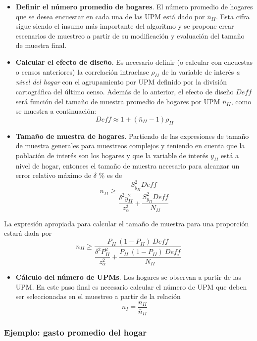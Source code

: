 \documentclass[
  10pt,
  spanish,
]{book}
\providecommand{\tightlist}{%
  \setlength{\itemsep}{0pt}\setlength{\parskip}{0pt}}
\begin{document}
\begin{itemize}
\item
  \textbf{Definir el número promedio de hogares}. El número promedio de hogares que se desea encuestar en cada una de las UPM está dado por \(\bar{n}_{II}\). Esta cifra sigue siendo el insumo más importante del algoritmo y se propone crear escenarios de muestreo a partir de su modificación y evaluación del tamaño de muestra final.
\item
  \textbf{Calcular el efecto de diseño}. Es necesario definir (o calcular con encuestas o censos anteriores) la correlación intraclase \(\rho_{II}\) de la variable de interés \emph{a nivel del hogar} con el agrupamiento por UPM definido por la división cartográfica del último censo. Además de lo anterior, el efecto de diseño \(Deff\) será función del tamaño de muestra promedio de hogares por UPM \(\bar{n}_{II}\), como se muestra a continuación:
  \[
  Deff \approx 1 + (\bar{n}_{II} - 1)\rho_{II}
  \]
\item
  \textbf{Tamaño de muestra de hogares}. Partiendo de las expresiones de tamaño de muestra generales para muestreos complejos y teniendo en cuenta que la población de interés son los hogares y que la variable de interés \(y_{II}\) está a nivel de hogar, entonces el tamaño de muestra necesario para alcanzar un error relativo máximo de \(\delta\) \% es de
  \[
  n_{II} \geq \dfrac{S^2_{y_{II}}Deff}{\dfrac{\delta^2 \bar{y}_{II}^2}{z_{\alpha}^2}+\dfrac{S^2_{y_{II}}Deff}{N_{II}}}
  \]
\end{itemize}

La expresión apropiada para calcular el tamaño de muestra para una proporción estará dada por
\[
n_{II} \geq \dfrac{P_{II}\ (1-P_{II})\ Deff}{\dfrac{\delta^2P^2_{II}}{z_{\alpha}^2 }+\dfrac{P_{II}\ (1-P_{II}) \ Deff}{N_{II}}}
\]

\begin{itemize}
\tightlist
\item
  \textbf{Cálculo del número de UPMs}. Los hogares se observan a partir de las UPM. En este paso final es necesario calcular el número de UPM que deben ser seleccionadas en el muestreo a partir de la relación
  \[
  n_{I} = \frac{n_{II}}{\bar{n}_{II}}
  \]
\end{itemize}

\hypertarget{ejemplo-gasto-promedio-del-hogar}{%
\subsubsection{Ejemplo: gasto promedio del hogar}\label{ejemplo-gasto-promedio-del-hogar}}
\end{document}
